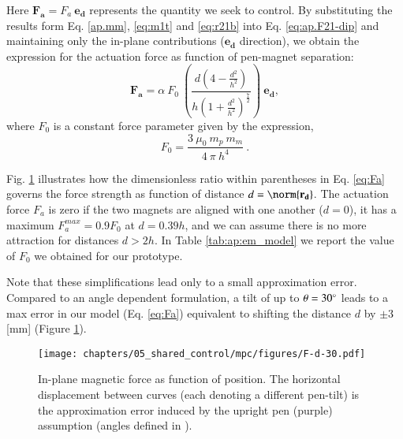     \noindent Here $\mathbf{F_a} = F_a \ \mathbf{e_d}$ represents the quantity we seek to control. 
    By substituting the results form Eq. \ref{ap.mm}, \ref{eq:m1t} and \ref{eq:r21b} into Eq. \ref{eq:ap.F21-dip} and maintaining only the in-plane contributions ($\mathbf{e_d}$ direction), we obtain the expression for the actuation force as function of pen-magnet separation:
    \begin{equation}
        \mathbf{F_a} = \alpha \ F_0 \ \left( \frac{d \left(4 - \frac{d^2}{h^2}\right)}{h \left(1 + \frac{d^2}{h^2}\right)^\frac{7}{2}} \right)  \ \mathbf{e_d} , \label{eq:Fa}
    \end{equation}
    where $F_0$ is a constant force parameter given by the expression,
    \begin{equation}
     F_0 = \frac{3 \ \mu_0 \ m_p \ m_m}{4 \ \pi \ h^4} \ . \label{eq:F0}
    \end{equation}
    
    Fig. \ref{fig:ap:approx_error} illustrates how the dimensionless ratio within parentheses in Eq. \ref{eq:Fa} governs the force strength as function of distance $d=\norm{\mathbf{r_d}}$. 
    The actuation force $F_a$ is zero if the two magnets are aligned with one another ($d=0$), it has a maximum $F_a^{max} = 0.9 F_0$ at $d=0.39h$, and we can assume there is no more attraction for distances $d>2h$. In Table \ref{tab:ap:em_model} we report the value of $F_0$ we obtained for our prototype.
    
    Note that these simplifications lead only to a small approximation error.
    Compared to an angle dependent formulation, a tilt of up to $\theta = 30^{\circ}$ leads to a max error in our model (Eq. \ref{eq:Fa}) equivalent to shifting the distance $d$ by $\pm 3$ [mm] (Figure \ref{fig:ap:approx_error}). 
    
    \begin{figure}[!t]
        \centering
        \texttt{[image: chapters/05\_shared\_control/mpc/figures/F-d-30.pdf]} \\
        \caption{In-plane magnetic force as function of position. The horizontal displacement between curves (each denoting a different pen-tilt) is the approximation error induced by the upright pen (purple) assumption (angles defined in \protect{}).}
        \label{fig:ap:approx_error}
    \end{figure}

